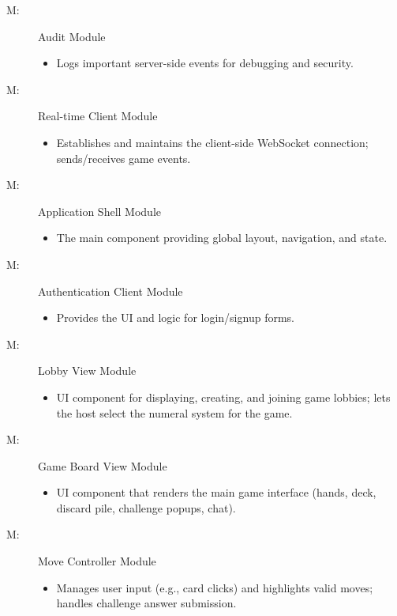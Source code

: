 \documentclass[12pt, titlepage]{article}
\newcounter{mnum}
\newcommand{\mthemnum}{M\themnum}
\begin{document}
\begin{description}
\item [ \mthemnum \label{mAudit}:] Audit Module
    \begin{itemize}
        \item Logs important server-side events for debugging and security.
    \end{itemize}

\item [ \mthemnum \label{mRealtimeClient}:] Real-time Client Module
    \begin{itemize}
        \item Establishes and maintains the client-side WebSocket connection; sends/receives game events.
    \end{itemize}

\item [ \mthemnum \label{mAppShell}:] Application Shell Module
    \begin{itemize}
        \item The main component providing global layout, navigation, and state.
    \end{itemize}

\item [ \mthemnum \label{mAuthClient}:] Authentication Client Module
    \begin{itemize}
        \item Provides the UI and logic for login/signup forms.
    \end{itemize}

\item [ \mthemnum \label{mLobbyView}:] Lobby View Module
    \begin{itemize}
        \item UI component for displaying, creating, and joining game lobbies; lets the host select the numeral system for the game.
    \end{itemize}

\item [ \mthemnum \label{mGameBoardView}:] Game Board View Module
    \begin{itemize}
        \item UI component that renders the main game interface (hands, deck, discard pile, challenge popups, chat).
    \end{itemize}

\item [ \mthemnum \label{mMoveController}:] Move Controller Module
    \begin{itemize}
        \item Manages user input (e.g., card clicks) and highlights valid moves; handles challenge answer submission.
    \end{itemize}


\end{description}
\end{document}
